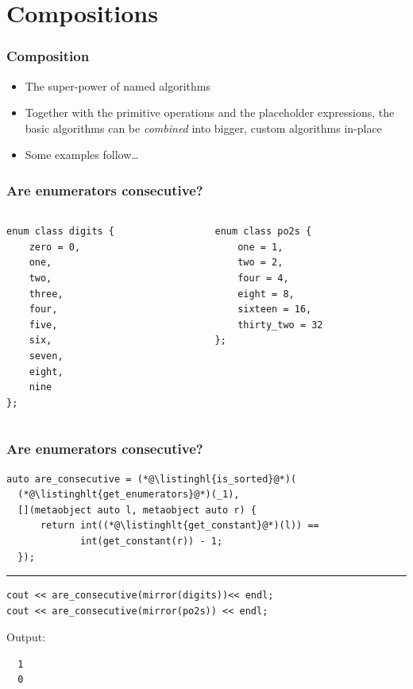 \documentclass[aspectratio=169,compress,table,xcolor=table]{beamer}
\begin{document}
\section{Compositions}
\begin{frame}
  \frametitle{Composition}
  \larger
  \begin{itemize}
    \item {\larger The {\larger super-power} of named algorithms}
    \item Together with the primitive operations and the placeholder expressions,
      the basic algorithms can be {\em \larger combined} into bigger,
      custom algorithms in-place
    \item Some examples follow\ldots
  \end{itemize}
\end{frame}
\begin{frame}[fragile]
  \frametitle{Are enumerators consecutive?}
  \begin{columns}
    \begin{column}{.43\textwidth}
      \begin{lstlisting}[language=c++2x,basicstyle=\small\ttfamily]
enum class digits {
    zero = 0,
    one,
    two,
    three,
    four,
    five,
    six,
    seven,
    eight,
    nine
};
      \end{lstlisting}
    \end{column}
    \begin{column}{.47\textwidth}
      \begin{lstlisting}[language=c++2x,basicstyle=\small\ttfamily]
enum class po2s {
    one = 1,
    two = 2,
    four = 4,
    eight = 8,
    sixteen = 16,
    thirty_two = 32
};
      \end{lstlisting}
    \end{column}
  \end{columns}
\end{frame}
\begin{frame}[fragile]
  \frametitle{Are enumerators consecutive?}
  \begin{lstlisting}[language=c++2x,basicstyle=\small\ttfamily]
auto are_consecutive = (*@\listinghl{is_sorted}@*)(
  (*@\listinghlt{get_enumerators}@*)(_1),
  [](metaobject auto l, metaobject auto r) {
      return int((*@\listinghlt{get_constant}@*)(l)) ==
             int(get_constant(r)) - 1;
  });
  \end{lstlisting}
  \hrule
  \begin{lstlisting}[language=c++2x,basicstyle=\small\ttfamily]
cout << are_consecutive(mirror(digits))<< endl;
cout << are_consecutive(mirror(po2s)) << endl;
  \end{lstlisting}
  Output:
  \begin{verbatim}
  1
  0
  \end{verbatim}
\end{frame}
\end{document}
